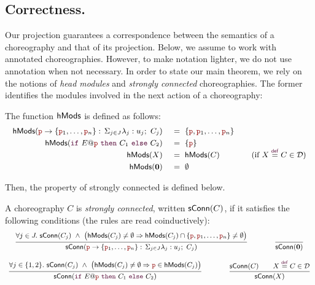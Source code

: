 \subsection{Correctness.}
Our projection guarantees a correspondence between the semantics of a
choreography and that of its projection. Below, we assume to work with
annotated choreographies. However, to make notation lighter, we do not
use annotation when not necessary.
In order to state our main theorem, we rely on the notions of
\emph{head modules} and \emph{strongly connected} choreographies. The
former identifies the modules involved in the next action of a
choreography:
\begin{defi}
  The function $\mathsf{hMods}$ is defined as follows:
  \begin{displaymath}\small
    \begin{array}{rll}
      \hmodules(\interact{\nr}{\nr_1,\ldots,\nr_n})\
      & = \ \{\nr, \nr_1,\dots,\nr_n\}\\[1mm]
      \hmodules(\ifTE {E}{\nr}{C_1}{C_2}) \ & =\ \{\nr\}\\
      \hmodules(X) \ & =\ \hmodules (C)\qquad\qquad(\text{if }
                       X\defrec C\in\defin)\\[1mm]
      \hmodules(\CEnd) \ & =\ \emptyset
    \end{array}
  \end{displaymath}
\end{defi}
Then, the property of strongly connected is defined below.
\begin{defi}
  A choreography $C$ is \emph{strongly connected}, written
  $\mathsf{sConn}(C)$, if it satisfies the following conditions (the
  rules are read coinductively):
  \begin{displaymath}\small
    \begin{array}{c}
      \infer {
      \sconnected(\interact{\nr}{\nr_1,\ldots,\nr_n})
      } {
      \forall j\in J.\ \sconnected(C_j)\ \land\ \big(\hmodules(C_j)\neq\emptyset\Rightarrow
      \hmodules(C_j)\cap\{\nr, \nr_1,\dots,\nr_n\}\neq\emptyset\big)
      }
      \qquad\qquad
      \infer {
      \sconnected(\CEnd)
      } {
      }
      \\\\

      \infer {
      \sconnected(\ifTE {E}{\nr}{C_1}{C_2})
      } {
      \forall j\in \{1,2\}.\ \sconnected(C_j)\ \land\ \big(\hmodules(C_j)
      \neq\emptyset\Rightarrow \nr\in\hmodules(C_j)\big)
      }
      \qquad\qquad
      \infer {
      \sconnected(X)
      } {
      \sconnected(C)\qquad X\defrec C\in\defin
        }
      \\\\
    \end{array}
  \end{displaymath}
\end{defi}

